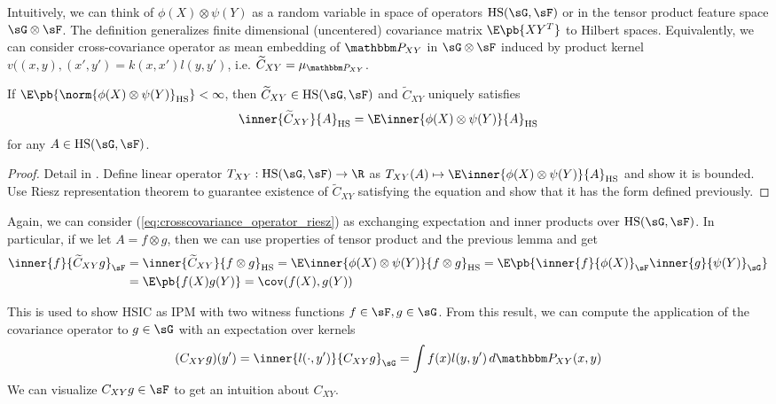 \documentclass[11pt]{article}
\begin{document}
Intuitively, we can think of $\phi(X)\otimes \psi(Y)$ as a random variable in space of operators $\text{HS}(\sG,\sF)$ or in the tensor product feature space $\sG\otimes \sF$. The definition generalizes finite dimensional (uncentered) covariance matrix $\E\pb{XY^T}$ to Hilbert spaces. Equivalently, we can consider cross-covariance operator as mean embedding of $\bbP_{XY}$ in $\sG\otimes\sF$ induced by product kernel $v((x,y),(x',y') = k(x,x')l(y,y')$, i.e. $\widetilde{C}_{XY} = \mu_{\bbP_{XY}}$. 

\begin{lemma}
    If $\E\pb{\norm{\phi(X)\otimes \psi(Y)}_{\text{HS}}} < \infty$, then $\widetilde{C}_{XY}\in\text{HS}(\sG,\sF)$ and $\widetilde{C}_{XY}$ uniquely satisfies
    \begin{align}
        \label{eq:crosscovariance_operator_riesz}
        \inner{\widetilde{C}_{XY}}{A}_{\text{HS}} 
            = \E\inner{\phi(X)\otimes \psi(Y)}{A}_{\text{HS}}
    \end{align}
    for any $A \in \text{HS}(\sG,\sF)$.
\end{lemma}

\begin{proof}
    Detail in \cite{grettonNotesMeanEmbeddings2019}. Define linear operator $T_{XY}: \text{HS}(\sG,\sF) \to\R$ as $T_{XY}(A) \mapsto \E\inner{\phi(X)\otimes \psi(Y)}{A}_{\text{HS}}$ and show it is bounded. Use Riesz representation theorem to guarantee existence of $\widetilde{C}_{XY}$ satisfying the equation and show that it has the form defined previously.
\end{proof}

Again, we can consider (\ref{eq:crosscovariance_operator_riesz}) as exchanging expectation and inner products over $\text{HS}(\sG,\sF)$. In particular, if we let $A=f\otimes g$, then we can use properties of tensor product and the previous lemma and get
\begin{align}
    \inner{f}{\widetilde{C}_{XY}g}_{\sF}
        &= \inner{\widetilde{C}_{XY}}{f\otimes g}_{\text{HS}} 
        = \E\inner{\phi(X)\otimes\psi(Y)}{f\otimes g}_{\text{HS}} 
        = \E\pb{ \inner{f}{\phi(X)}_{\sF} \inner{g}{\psi(Y)}_{\sG} } \\
        &= \E\pb{ f(X)g(Y) }
        = \cov(f(X),g(Y))
\end{align}

This is used to show HSIC as IPM with two witness functions $f\in\sF,g\in\sG$. From this result, we can compute the application of the covariance operator to $g\in\sG$ with an expectation over kernels 
\begin{align}
    (C_{XY} g)(y')
        = \inner{l(\cdot, y')}{C_{XY}g}_{\sG}
        = \int f(x) l(y,y') \,d\bbP_{XY}(x,y)
\end{align}
We can visualize $C_{XY}g \in \sF$ to get an intuition about $C_{XY}$.
\end{document}
